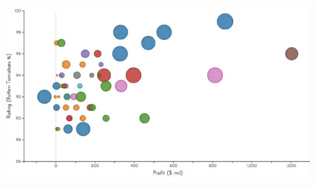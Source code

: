 \begin{itemize}
\begin{center}
        \includegraphics[scale=0.4]{images/marco_teorico/burbuja_chart.png}
        \label{fig:marco_teorico_burbujas_chart}
        \bigbreak
    \end{center}
\end{itemize}